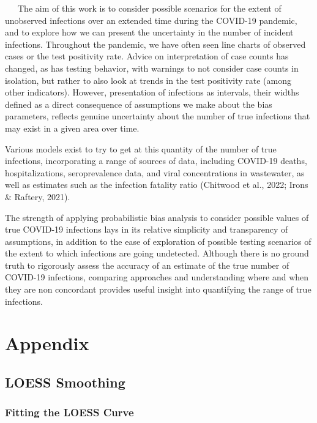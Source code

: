 \documentclass[12pt,twoside]{smiththesis}
\begin{document}
~~~The aim of this work is to consider possible scenarios for the extent of unobserved infections over an extended time during the COVID-19 pandemic, and to explore how we can present the uncertainty in the number of incident infections. Throughout the pandemic, we have often seen line charts of observed cases or the test positivity rate. Advice on interpretation of case counts has changed, as has testing behavior, with warnings to not consider case counts in isolation, but rather to also look at trends in the test positivity rate (among other indicators). However, presentation of infections as intervals, their widths defined as a direct consequence of assumptions we make about the bias parameters, reflects genuine uncertainty about the number of true infections that may exist in a given area over time.

Various models exist to try to get at this quantity of the number of true infections, incorporating a range of sources of data, including COVID-19 deaths, hospitalizations, seroprevalence data, and viral concentrations in wastewater, as well as estimates such as the infection fatality ratio (Chitwood et al., 2022; Irons \& Raftery, 2021).

The strength of applying probabilistic bias analysis to consider possible values of true COVID-19 infections lays in its relative simplicity and transparency of assumptions, in addition to the ease of exploration of possible testing scenarios of the extent to which infections are going undetected. Although there is no ground truth to rigorously assess the accuracy of an estimate of the true number of COVID-19 infections, comparing approaches and understanding where and when they are non concordant provides useful insight into quantifying the range of true infections.

\appendix

\hypertarget{appendix}{%
\chapter{Appendix}\label{appendix}}

\hypertarget{loess}{%
\section{LOESS Smoothing}\label{loess}}

\hypertarget{fitting-the-loess-curve}{%
\subsection{Fitting the LOESS Curve}\label{fitting-the-loess-curve}}
\end{document}
